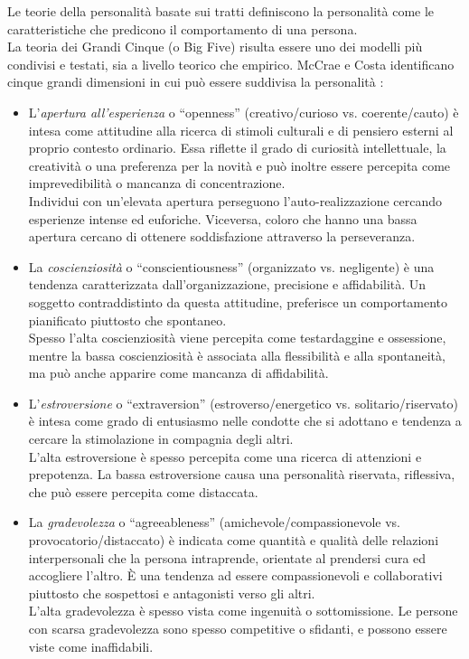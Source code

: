 Le teorie della personalità basate sui tratti definiscono la personalità come le caratteristiche che predicono il comportamento di una persona. 
\\
La teoria dei Grandi Cinque (o Big Five) risulta essere uno dei modelli più condivisi e testati, sia a livello teorico che empirico.
McCrae e Costa identificano cinque grandi dimensioni in cui può essere suddivisa la personalità \cite{goldberg1993structure,costa2008revised}:
\begin{itemize}
	\item L'\emph{apertura all'esperienza} o ``openness'' (creativo/curioso vs. coerente/cauto) è intesa come attitudine alla ricerca di stimoli culturali e di pensiero esterni al proprio contesto ordinario.
	Essa riflette il grado di curiosità intellettuale, la creatività o una preferenza per la novità e può inoltre essere percepita come imprevedibilità o mancanza di concentrazione. \\ 
	Individui con un'elevata apertura perseguono l'auto-realizzazione cercando esperienze intense ed euforiche. Viceversa, coloro che hanno una bassa apertura cercano di ottenere soddisfazione attraverso la perseveranza.
	
	\item La \emph{coscienziosità} o ``conscientiousness'' (organizzato vs. negligente) è una tendenza caratterizzata dall'organizzazione, precisione e affidabilità. Un soggetto contraddistinto da questa attitudine, preferisce un comportamento pianificato piuttosto che spontaneo.\\  
	Spesso l'alta coscienziosità viene percepita come testardaggine e ossessione, mentre la bassa coscienziosità è associata alla flessibilità e alla spontaneità, ma può anche apparire come mancanza di affidabilità.
		
	\item L'\emph{estroversione} o ``extraversion''  (estroverso/energetico vs. solitario/riservato) è intesa come grado di entusiasmo nelle condotte che si adottano e tendenza a cercare la stimolazione in compagnia degli altri.\\ 
	L'alta estroversione è spesso percepita come una ricerca di attenzioni e prepotenza. La bassa estroversione causa una personalità riservata, riflessiva, che può essere percepita come distaccata.  
	
	\item La \emph{gradevolezza} o ``agreeableness'' (amichevole/compassionevole vs. provocatorio/distaccato) è indicata come quantità e qualità delle relazioni interpersonali che la persona intraprende, orientate al prendersi cura ed accogliere l'altro. È una tendenza ad essere compassionevoli e collaborativi piuttosto che sospettosi e antagonisti verso gli altri. \\
	L'alta gradevolezza è spesso vista come ingenuità o sottomissione. Le persone con scarsa gradevolezza sono spesso competitive o sfidanti, e possono essere viste come inaffidabili.


\end{itemize}
